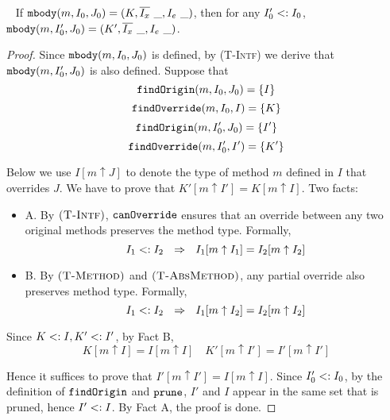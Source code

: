 \begin{lemma}~\label{lemma:mbody_type_preservation}
If $\mbody(m, I_0, J_0) = (K, \overline{I_x}\ \_, I_e\ \_)$, then for any $I'_0 <: I_0$, $\texttt{mbody}(m, I'_0, J_0) = (K', \overline{I_x}\ \_, I_e\ \_)$.
\end{lemma}
\begin{proof}
	
Since $\texttt{mbody}(m, I_0, J_0)$ is defined, by \textsc{(T-Intf)} we derive that $\texttt{mbody}(m, I'_0, J_0)$ is also defined. Suppose that $$\texttt{findOrigin}(m, I_0, J_0) = \{I\}$$ $$\texttt{findOverride}(m, I_0, I) = \{K\}$$
$$\texttt{findOrigin}(m, I'_0, J_0) = \{I'\}$$ $$\texttt{findOverride}(m, I'_0, I') = \{K'\}$$

Below we use $I[m\uparrow J]$ to denote the type of method $m$ defined in $I$ that overrides $J$. We have to prove that $K'[m\uparrow I'] = K[m\uparrow I]$.
Two facts:
\begin{itemize}
	\item A. By $\textsc{(T-Intf)}$, $\texttt{canOverride}$ ensures that an override between any two original methods preserves the method type. Formally, $$I_1 \subtype I_2 \ \ \Rightarrow\ \ I_1[m\uparrow I_1] = I_2[m\uparrow I_2]$$
	\item B. By $\textsc{(T-Method)}$ and $\textsc{(T-AbsMethod)}$, any partial override also preserves method type. Formally,
	  $$I_1 <: I_2\ \ \Rightarrow\ \ I_1[m\uparrow I_2] = I_2[m\uparrow I_2]$$
\end{itemize}

Since $K <: I, K' <: I'$, by Fact B, $$K[m\uparrow I] = I[m\uparrow I] \quad K'[m\uparrow I'] = I'[m\uparrow I']$$

Hence it suffices to prove that $I'[m\uparrow I'] = I[m\uparrow I]$. Since $I'_0 <: I_0$, by the definition of $\texttt{findOrigin}$ and $\texttt{prune}$, $I'$ and $I$
appear in the same set that is pruned, hence $I' <: I$. By Fact A, the proof is done.
\end{proof}


